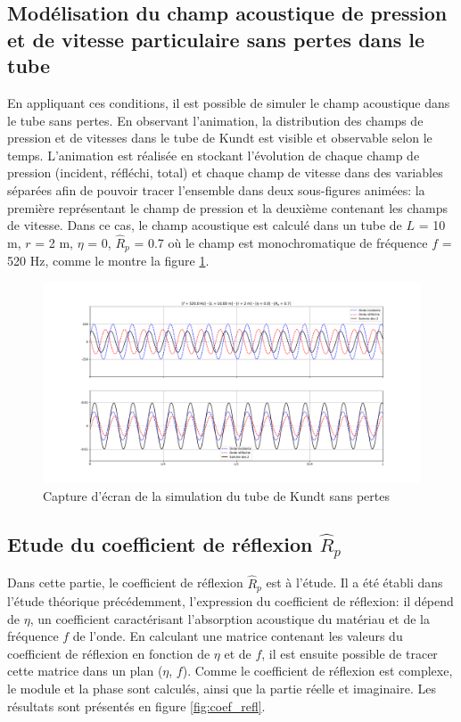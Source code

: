 \documentclass[a4paper, 11pt]{article}
\begin{document}
\subsection{Modélisation du champ acoustique de pression et de vitesse particulaire sans pertes dans le tube}
En appliquant ces conditions, il est possible de simuler le champ acoustique dans le tube sans pertes. En observant l'animation, la distribution des champs de pression et de vitesses dans le tube de Kundt est visible et observable selon le temps. L'animation est réalisée en stockant l'évolution de chaque champ de pression (incident, réfléchi, total) et chaque champ de vitesse dans des variables séparées afin de pouvoir tracer l'ensemble dans deux sous-figures animées: la première représentant le champ de pression et la deuxième contenant les champs de vitesse. Dans ce cas, le champ acoustique est calculé dans un tube de $L$ = 10 m, $r$ = 2 m, $\eta$ = 0, $\hat{R}_p$ = 0.7 où le champ est monochromatique de fréquence $f$ = 520 Hz, comme le montre la figure \ref{fig:sspertes}.

\begin{figure}[H]
	\centering 
	\includegraphics[width=\linewidth]{Figures/tubeKundt_ssperte.pdf}
	\caption{Capture d'écran de la simulation du tube de Kundt sans pertes}
	\label{fig:sspertes} 
\end{figure}

\subsection{Etude du coefficient de réflexion $\hat{R}_p$}
Dans cette partie, le coefficient de réflexion $\hat{R}_p$ est à l'étude. Il a été établi dans l'étude théorique précédemment, l'expression du coefficient de réflexion: il dépend de $\eta$, un coefficient caractérisant l'absorption acoustique du matériau et de la fréquence $f$ de l'onde.
En calculant une matrice contenant les valeurs du coefficient de réflexion en fonction de $\eta$ et de $f$, il est ensuite possible de tracer cette matrice dans un plan ($\eta$, $f$). Comme le coefficient de réflexion est complexe, le module et la phase sont calculés, ainsi que la partie réelle et imaginaire. Les résultats sont présentés en figure \ref{fig:coef_refl}.
\end{document}
